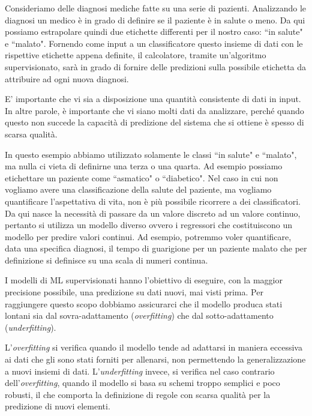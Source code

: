 \documentclass[12pt,italian]{report}
\begin{document}
Consideriamo delle diagnosi mediche fatte su una serie di pazienti. Analizzando le diagnosi un medico è in grado di definire se il paziente è in salute o meno. Da qui possiamo estrapolare quindi due etichette differenti per il nostro caso: ``in salute" e ``malato". Fornendo come input a un classificatore questo insieme di dati con le rispettive etichette appena definite, il calcolatore, tramite un'algoritmo supervisionato, sarà in grado di fornire delle predizioni sulla possibile etichetta da attribuire ad ogni nuova diagnosi.

E' importante che vi sia a disposizione una quantità consistente di dati in input. In altre parole, è importante che vi siano molti dati da analizzare, perché quando questo non succede la capacità di predizione del sistema che si ottiene è spesso di scarsa qualità.

In questo esempio abbiamo utilizzato solamente le classi ``in salute" e ``malato", ma nulla ci vieta di definirne una terza o una quarta. Ad esempio possiamo etichettare un paziente come ``asmatico" o ``diabetico".
Nel caso in cui non vogliamo avere una classificazione della salute del paziente, ma vogliamo quantificare l'aspettativa di vita, non è più possibile ricorrere a dei classificatori. Da qui nasce la necessità di passare da un valore discreto ad un valore continuo, pertanto si utilizza un modello diverso ovvero i regressori che costituiscono un modello per predire valori continui. Ad esempio, potremmo voler quantificare, data una specifica diagnosi, il tempo di guarigione per un paziente malato che per definizione si definisce su una scala di numeri continua.

I modelli di ML supervisionati hanno l'obiettivo di eseguire, con la maggior precisione possibile, una predizione su dati nuovi, mai visti prima. Per raggiungere questo scopo dobbiamo assicurarci che il modello produca stati lontani sia dal sovra-adattamento (\emph{overfitting}) che dal sotto-adattamento (\emph{underfitting}). 

L'\emph{overfitting} si verifica quando il modello tende ad adattarsi in maniera eccessiva ai dati che gli sono stati forniti per allenarsi, non permettendo la generalizzazione a nuovi insiemi di dati. 
L'\emph{underfitting} invece, si verifica nel caso contrario dell'\emph{overfitting}, quando il modello si basa su schemi troppo semplici e poco robusti, il che comporta la definizione di regole con scarsa qualità per la predizione di nuovi elementi.
\end{document}
